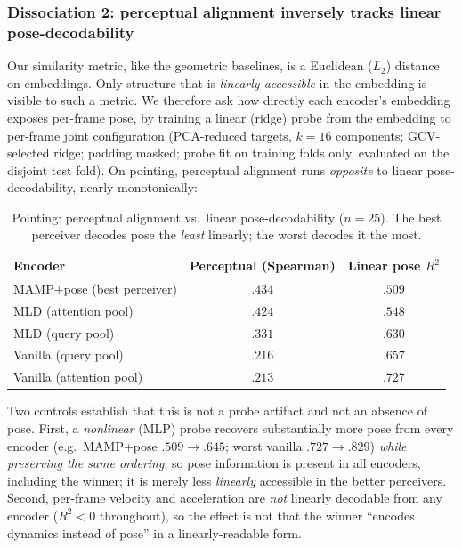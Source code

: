 \documentclass[letterpaper]{article} %
\begin{document}
\subsubsection{Dissociation 2: perceptual alignment inversely tracks linear pose-decodability}
Our similarity metric, like the geometric baselines, is a Euclidean ($L_2$) distance on embeddings.
Only structure that is \emph{linearly accessible} in the embedding is visible to such a metric. We
therefore ask how directly each encoder's embedding exposes per-frame pose, by training a linear
(ridge) probe from the embedding to per-frame joint configuration (PCA-reduced targets, $k{=}16$
components; GCV-selected ridge; padding masked; probe fit on training folds only, evaluated on the
disjoint test fold). On pointing, perceptual alignment runs \emph{opposite} to linear
pose-decodability, nearly monotonically:

\begin{table}[h]
\centering
\small
\setlength{\tabcolsep}{5pt}
\caption{Pointing: perceptual alignment vs.\ linear pose-decodability ($n=25$). The best perceiver
decodes pose the \emph{least} linearly; the worst decodes it the most.}
\begin{tabular}{lcc}
\toprule
Encoder & Perceptual (Spearman) & Linear pose $R^2$ \\
\midrule
MAMP$+$pose (best perceiver) & $\mathbf{.434}$ & $.509$ \\
MLD (attention pool)         & $.424$ & $.548$ \\
MLD (query pool)             & $.331$ & $.630$ \\
Vanilla (query pool)         & $.216$ & $.657$ \\
Vanilla (attention pool)     & $.213$ & $\mathbf{.727}$ \\
\bottomrule
\end{tabular}
\end{table}

Two controls establish that this is not a probe artifact and not an absence of pose. First, a
\emph{nonlinear} (MLP) probe recovers substantially more pose from every encoder (e.g.\ MAMP+pose
$.509\!\to\!.645$; worst vanilla $.727\!\to\!.829$) \emph{while preserving the same ordering}, so
pose information is present in all encoders, including the winner; it is merely less
\emph{linearly} accessible in the better perceivers. Second, per-frame velocity and acceleration are
\emph{not} linearly decodable from any encoder ($R^2<0$ throughout), so the effect is not that the
winner ``encodes dynamics instead of pose'' in a linearly-readable form.
\end{document}
